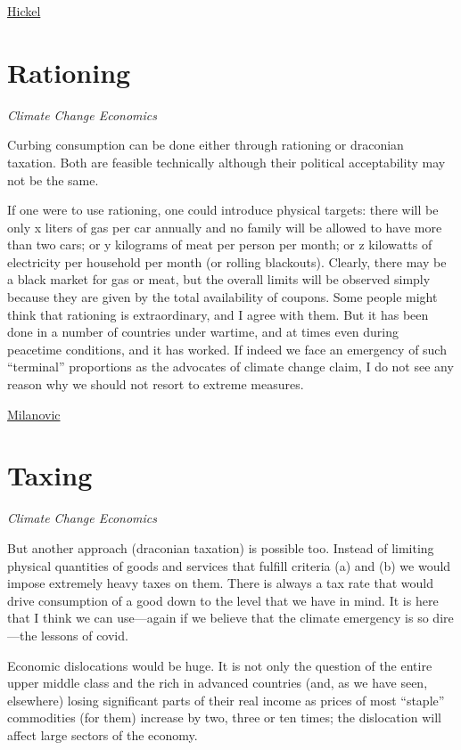 \documentclass[
]{book}
\begin{document}
\href{https://www.jasonhickel.org/blog/2021/2/21/is-the-world-poor-or-unjust}{Hickel}

\hypertarget{rationing}{%
\chapter{Rationing}\label{rationing}}

\emph{Climate Change Economics}

Curbing consumption can be done either through rationing or draconian taxation. Both are feasible technically although their political acceptability may not be the same.

If one were to use rationing, one could introduce physical targets: there will be only x liters of gas per car annually and no family will be allowed to have more than two cars; or y kilograms of meat per person per month; or z kilowatts of electricity per household per month (or rolling blackouts). Clearly, there may be a black market for gas or meat, but the overall limits will be observed simply because they are given by the total availability of coupons. Some people might think that rationing is extraordinary, and I agree with them. But it has been done in a number of countries under wartime, and at times even during peacetime conditions, and it has worked. If indeed we face an emergency of such ``terminal'' proportions as the advocates of climate change claim, I do not see any reason why we should not resort to extreme measures.

\href{http://glineq.blogspot.com/2021/02/climate-change-covid-and-global.html}{Milanovic}

\hypertarget{taxing}{%
\chapter{Taxing}\label{taxing}}

\emph{Climate Change Economics}

But another approach (draconian taxation) is possible too. Instead of limiting physical quantities of goods and services that fulfill criteria (a) and (b) we would impose extremely heavy taxes on them. There is always a tax rate that would drive consumption of a good down to the level that we have in mind. It is here that I think we can use---again if we believe that the climate emergency is so dire---the lessons of covid.

Economic dislocations would be huge. It is not only the question of the entire upper middle class and the rich in advanced countries (and, as we have seen, elsewhere) losing significant parts of their real income as prices of most ``staple'' commodities (for them) increase by two, three or ten times; the dislocation will affect large sectors of the economy.
\end{document}

